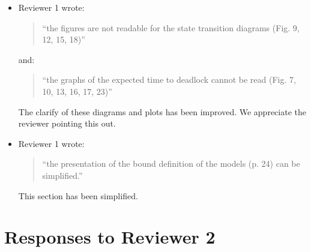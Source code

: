 \documentclass{article}
\begin{document}
\begin{itemize}
\item Reviewer 1 wrote:
\begin{quote}
``the figures are not readable for the state transition diagrams (Fig. 9, 12,
15, 18)''
\end{quote}

and:

\begin{quote}
``the graphs of the expected time to deadlock cannot be read (Fig. 7, 10, 13,
16, 17, 23)''
\end{quote}

The clarify of these diagrams and plots has been improved.
We appreciate the reviewer pointing this out.


\item Reviewer 1 wrote:
\begin{quote}
``the presentation of the bound definition of the models (p. 24) can be
simplified.''
\end{quote}
This section has been simplified.

\end{itemize}



\section*{Responses to Reviewer 2}
\end{document}

